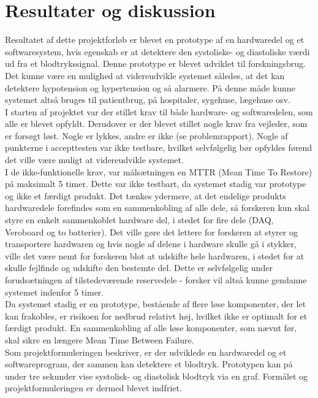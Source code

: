 \section{Resultater og diskussion}
Resultatet af dette projektforløb er blevet en prototype af en hardwaredel og et softwaresystem, hvis egenskab er at detektere den systoliske- og diastoliske værdi ud fra et blodtrykssignal. Denne prototype er blevet udviklet til forskningsbrug. Det kunne være en mulighed at videreudvikle systemet således, at det kan detektere hypotension og hypertension og så alarmere. På denne måde kunne systemet altså bruges til patientbrug, på hospitaler, sygehuse, lægehuse osv. \\
I starten af projektet var der stillet krav til både hardware- og softwaredelen, som alle er blevet opfyldt. Derudover er der blevet stillet nogle krav fra vejleder, som er forsøgt løst. Nogle er lykkes, andre er ikke (se problemrapport). Nogle af punkterne i accepttesten var ikke testbare, hvilket selvfølgelig bør opfyldes førend det ville være muligt at videreudvikle systemet. \\
I de ikke-funktionelle krav, var målsætningen en MTTR (Mean Time To Restore) på maksimalt 5 timer. Dette var ikke testbart, da systemet stadig var prototype og ikke et færdigt produkt.
Det tænkes ydermere, at det endelige produkts hardwaredele forefindes som en sammenkobling af alle dele, så forskeren kun skal styre en enkelt sammenkoblet hardware del, i stedet for fire dele (DAQ, Veroboard og to batterier). Det ville gøre det lettere for forskeren at styrer og transportere hardwaren og hvis nogle af delene i hardware skulle gå i stykker, ville det være nemt for forskeren blot at udskifte hele hardwaren, i stedet for at skulle fejlfinde og udskifte den bestemte del. Dette er selvfølgelig under forudsætningen af tilstedeværende reservedele - forsker vil altså kunne gendanne systemet indenfor 5 timer. \\
Da systemet stadig er en prototype, bestående af flere løse komponenter, der let kan frakobles, er risikoen for nedbrud relativt høj, hvilket ikke er optimalt for et færdigt produkt. En sammenkobling af alle løse komponenter, som nævnt før, skal sikre en længere Mean Time Between Failure. \\
Som projektformuleringen beskriver, er der udviklede en hardwaredel og et softwareprogram, der sammen kan detektere et blodtryk. Prototypen kan på under tre sekunder vise systolisk- og diastolisk blodtryk via en graf. Formålet og projektformuleringen er dermed blevet indfriet.  \\
